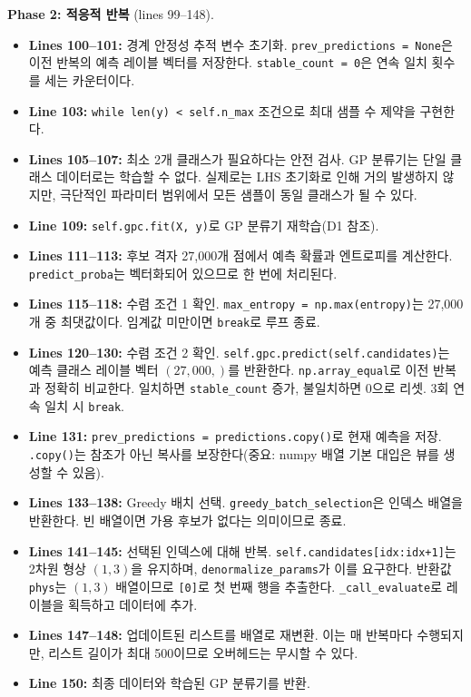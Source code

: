 \documentclass[11pt]{article}
\begin{document}
\textbf{Phase 2: 적응적 반복} (lines 99--148).
\begin{itemize}
  \item \textbf{Lines 100--101:} 경계 안정성 추적 변수 초기화. \texttt{prev\_predictions = None}은 이전 반복의 예측 레이블 벡터를 저장한다. \texttt{stable\_count = 0}은 연속 일치 횟수를 세는 카운터이다.
  \item \textbf{Line 103:} \texttt{while len(y) < self.n\_max} 조건으로 최대 샘플 수 제약을 구현한다.
  \item \textbf{Lines 105--107:} 최소 2개 클래스가 필요하다는 안전 검사. GP 분류기는 단일 클래스 데이터로는 학습할 수 없다. 실제로는 LHS 초기화로 인해 거의 발생하지 않지만, 극단적인 파라미터 범위에서 모든 샘플이 동일 클래스가 될 수 있다.
  \item \textbf{Line 109:} \texttt{self.gpc.fit(X, y)}로 GP 분류기 재학습(D1 참조).
  \item \textbf{Lines 111--113:} 후보 격자 27{,}000개 점에서 예측 확률과 엔트로피를 계산한다. \texttt{predict\_proba}는 벡터화되어 있으므로 한 번에 처리된다.
  \item \textbf{Lines 115--118:} 수렴 조건 1 확인. \texttt{max\_entropy = np.max(entropy)}는 27{,}000개 중 최댓값이다. 임계값 미만이면 \texttt{break}로 루프 종료.
  \item \textbf{Lines 120--130:} 수렴 조건 2 확인. \texttt{self.gpc.predict(self.candidates)}는 예측 클래스 레이블 벡터 $(27{,}000,)$를 반환한다. \texttt{np.array\_equal}로 이전 반복과 정확히 비교한다. 일치하면 \texttt{stable\_count} 증가, 불일치하면 0으로 리셋. 3회 연속 일치 시 \texttt{break}.
  \item \textbf{Line 131:} \texttt{prev\_predictions = predictions.copy()}로 현재 예측을 저장. \texttt{.copy()}는 참조가 아닌 복사를 보장한다(중요: numpy 배열 기본 대입은 뷰를 생성할 수 있음).
  \item \textbf{Lines 133--138:} Greedy 배치 선택. \texttt{greedy\_batch\_selection}은 인덱스 배열을 반환한다. 빈 배열이면 가용 후보가 없다는 의미이므로 종료.
  \item \textbf{Lines 141--145:} 선택된 인덱스에 대해 반복. \texttt{self.candidates[idx:idx+1]}는 2차원 형상 $(1, 3)$을 유지하며, \texttt{denormalize\_params}가 이를 요구한다. 반환값 \texttt{phys}는 $(1, 3)$ 배열이므로 \texttt{[0]}로 첫 번째 행을 추출한다. \texttt{\_call\_evaluate}로 레이블을 획득하고 데이터에 추가.
  \item \textbf{Lines 147--148:} 업데이트된 리스트를 배열로 재변환. 이는 매 반복마다 수행되지만, 리스트 길이가 최대 500이므로 오버헤드는 무시할 수 있다.
  \item \textbf{Line 150:} 최종 데이터와 학습된 GP 분류기를 반환.
\end{itemize}
\end{document}
